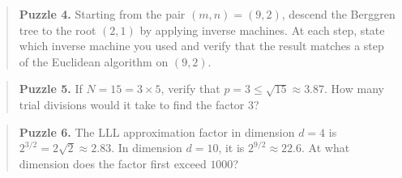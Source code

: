 \begin{quote}
\textbf{Puzzle 4.} Starting from the pair $(m, n) = (9, 2)$, descend the Berggren tree to the root $(2, 1)$ by applying inverse machines. At each step, state which inverse machine you used and verify that the result matches a step of the Euclidean algorithm on $(9, 2)$.
\end{quote}

\begin{quote}
\textbf{Puzzle 5.} If $N = 15 = 3 \times 5$, verify that $p = 3 \le \sqrt{15} \approx 3.87$. How many trial divisions would it take to find the factor $3$?
\end{quote}

\begin{quote}
\textbf{Puzzle 6.} The LLL approximation factor in dimension $d = 4$ is $2^{3/2} = 2\sqrt{2} \approx 2.83$. In dimension $d = 10$, it is $2^{9/2} \approx 22.6$. At what dimension does the factor first exceed $1000$?
\end{quote}

